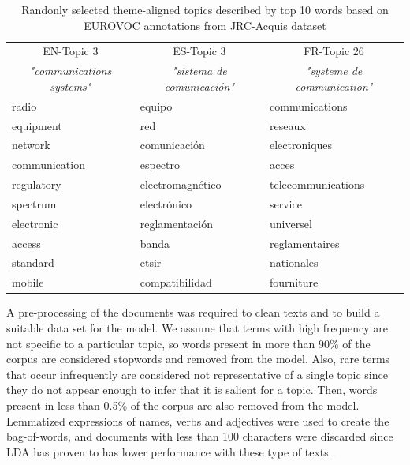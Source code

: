\begin{table}\centering
  \begin{tabular}{l|l|l}
  \hline
      \multicolumn{1}{c}{EN-Topic 3} & \multicolumn{1}{c}{ES-Topic 3} & \multicolumn{1}{c}{FR-Topic 26}  \\
      \multicolumn{1}{c}{\textit{"communications systems"}} & \multicolumn{1}{c}{\textit{"sistema de comunicaci\'on"}} & \multicolumn{1}{c}{\textit{"systeme de communication"}} \\
  \hline
     radio          & equipo                & communications        \\
     equipment      & red                   & reseaux               \\
     network        & comunicaci\'on        & electroniques          \\
     communication  & espectro              & acces                  \\
     regulatory     & electromagn\'etico    & telecommunications     \\
     spectrum       & electr\'onico         & service                \\
     electronic     & reglamentaci\'on      & universel              \\
     access         & banda                 & reglamentaires         \\
     standard       & etsir                 & nationales             \\
     mobile         & compatibilidad        & fourniture             \\
    \bottomrule
  \end{tabular}
\caption{Randonly selected theme-aligned topics described by top 10 words based on EUROVOC annotations from JRC-Acquis dataset}
\label{tb:topics}
\end{table}

 A pre-processing of the documents was required to clean texts and to build a suitable data set for the model. We assume that terms with high frequency are not specific to a particular topic, so words present in more than 90\% of the corpus are considered stopwords and removed from the model. Also, rare terms that occur infrequently are considered not representative of a single topic since they do not appear enough to infer that it is salient for a topic. Then, words present in less than 0.5\% of the corpus are also removed from the model. Lemmatized expressions of names, verbs and adjectives were used to create the bag-of-words, and documents with less than 100 characters were discarded since LDA has proven to has lower performance with these type of texts \citep{Cheng2014a}. 
 
